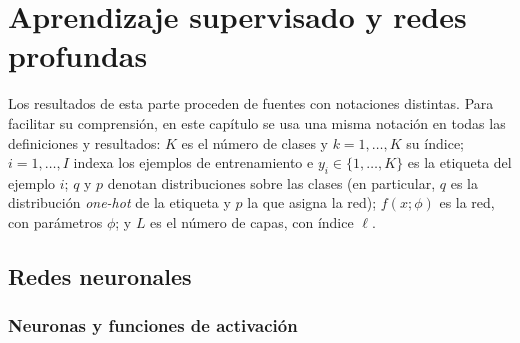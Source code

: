%

\chapter{Aprendizaje supervisado y redes profundas}\label{cap:aprendizaje}


Los resultados de esta parte proceden de fuentes con notaciones distintas. Para
facilitar su comprensión, en este capítulo se usa una misma notación en todas las
definiciones y resultados: $K$ es el número de clases y $k = 1,\dots,K$ su
índice; $i = 1,\dots,I$ indexa los ejemplos de entrenamiento e
$y_i\in\{1,\dots,K\}$ es la etiqueta del ejemplo $i$; $q$ y $p$ denotan
distribuciones sobre las clases (en particular, $q$ es la distribución
\emph{one-hot} de la etiqueta y $p$ la que asigna la red); $f(x;\phi)$ es la red,
con parámetros $\phi$; y $L$ es el número de capas, con índice $\ell$.

\section{Redes neuronales}\label{sec:redes}

\subsection{Neuronas y funciones de activación}\label{sec:activaciones}


